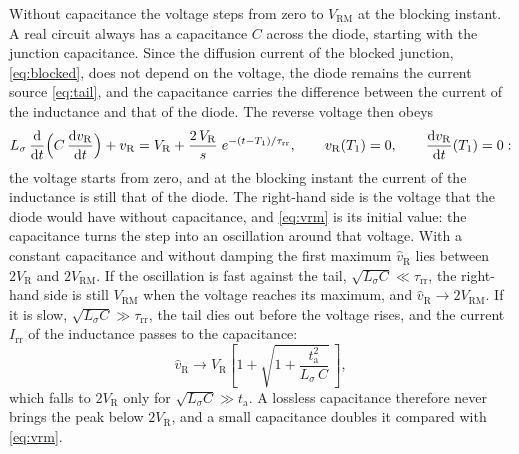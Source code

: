 \documentclass[10pt,a4paper]{scrartcl}
\newcommand{\VR}{V_\mathrm{R}}
\newcommand{\Irr}{I_\mathrm{rr}}
\newcommand{\ta}{t_\mathrm{a}}
\newcommand{\taurr}{\tau_\mathrm{rr}}
\newcommand{\Tone}{T_1}
\newcommand{\Vrm}{V_\mathrm{RM}}
\newcommand{\diff}{\mathrm{d}}
\newcommand{\Ls}{L_\sigma}                    %
\begin{document}
Without capacitance the voltage steps from zero to $\Vrm$ at the blocking instant. A real circuit always has a capacitance $C$ across the diode, starting with the junction capacitance. Since the diffusion current of the blocked junction, \eqref{eq:blocked}, does not depend on the voltage, the diode remains the current source \eqref{eq:tail}, and the capacitance carries the difference between the current of the inductance and that of the diode. The reverse voltage then obeys
\begin{equation}
\Ls\,\frac{\diff}{\diff t}\Bigl(C\,\frac{\diff v_\mathrm{R}}{\diff t}\Bigr) + v_\mathrm{R} = \VR + \frac{2\,\VR}{s}\;e^{-(t-\Tone)/\taurr} , \qquad v_\mathrm{R}(\Tone) = 0 , \qquad \frac{\diff v_\mathrm{R}}{\diff t}(\Tone) = 0 :
\label{eq:vlc}
\end{equation}
the voltage starts from zero, and at the blocking instant the current of the inductance is still that of the diode. The right-hand side is the voltage that the diode would have without capacitance, and \eqref{eq:vrm} is its initial value: the capacitance turns the step into an oscillation around that voltage. With a constant capacitance and without damping the first maximum $\hat v_\mathrm{R}$ lies between $2\VR$ and $2\Vrm$. If the oscillation is fast against the tail, $\sqrt{\Ls C} \ll \taurr$, the right-hand side is still $\Vrm$ when the voltage reaches its maximum, and $\hat v_\mathrm{R} \to 2\Vrm$. If it is slow, $\sqrt{\Ls C} \gg \taurr$, the tail dies out before the voltage rises, and the current $\Irr$ of the inductance passes to the capacitance:
\begin{equation}
\hat v_\mathrm{R} \to \VR\left[1 + \sqrt{1 + \frac{\ta^2}{\Ls\,C}}\,\right] ,
\label{eq:vpkslow}
\end{equation}
which falls to $2\VR$ only for $\sqrt{\Ls C} \gg \ta$. A lossless capacitance therefore never brings the peak below $2\VR$, and a small capacitance doubles it compared with \eqref{eq:vrm}.
\end{document}
